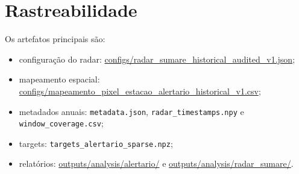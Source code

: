\documentclass[11pt,a4paper]{article}
\begin{document}
\section{Rastreabilidade}
Os artefatos principais são:
\begin{itemize}
\item configuração do radar: \url{configs/radar_sumare_historical_audited_v1.json};
\item mapeamento espacial: \url{configs/mapeamento_pixel_estacao_alertario_historical_v1.csv};
\item metadados anuais: \texttt{metadata.json}, \texttt{radar\_timestamps.npy} e \texttt{window\_coverage.csv};
\item targets: \texttt{targets\_alertario\_sparse.npz};
\item relatórios: \url{outputs/analysis/alertario/} e \url{outputs/analysis/radar_sumare/}.
\end{itemize}
\end{document}
